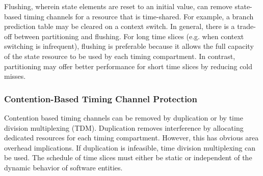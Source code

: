 Flushing, wherein state elements are reset to an initial value,
can remove state-based timing channels for a resource that is time-shared.
For example, a branch prediction table may be cleared on a context switch.
In general, there is a trade-off between partitioning and flushing.
For long time slices (e.g. when context switching is infrequent), flushing is 
preferable because it allows the full capacity of the state resource to be used by
each timing compartment. In contrast, partitioning may
offer better performance for short time slices by reducing cold misses.

\subsubsection{Contention-Based Timing Channel Protection}

Contention based timing channels can be removed by duplication or by
time division multiplexing (TDM). Duplication removes interference by
allocating dedicated resources for each timing compartment.
However, this has obvious area overhead implications. If duplication is 
infeasible, time division multiplexing can be used.
The schedule of time slices must either be static or independent of the dynamic 
behavior of software entities.


